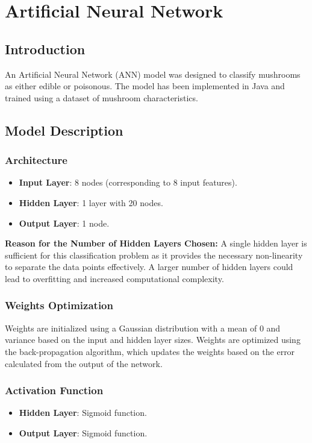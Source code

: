 \documentclass{article}
\begin{document}
\section{Artificial Neural Network}
\subsection{Introduction}
An Artificial Neural Network (ANN) model was designed to classify mushrooms as either edible or poisonous. The model has been implemented in Java and trained using a dataset of mushroom characteristics.

\subsection{Model Description}

\subsubsection{Architecture}
\begin{itemize}
    \item \textbf{Input Layer}: 8 nodes (corresponding to 8 input features).
    \item \textbf{Hidden Layer}: 1 layer with 20 nodes.
    \item \textbf{Output Layer}: 1 node.
\end{itemize}

\textbf{Reason for the Number of Hidden Layers Chosen:} A single hidden layer is sufficient for this classification problem as it provides the necessary non-linearity to separate the data points effectively. A larger number of hidden layers could lead to overfitting and increased computational complexity.

\subsubsection{Weights Optimization}
Weights are initialized using a Gaussian distribution with a mean of 0 and variance based on the input and hidden layer sizes. Weights are optimized using the back-propagation algorithm, which updates the weights based on the error calculated from the output of the network.

\subsubsection{Activation Function}
\begin{itemize}
    \item \textbf{Hidden Layer}: Sigmoid function.
    \item \textbf{Output Layer}: Sigmoid function.
\end{itemize}
\end{document}

